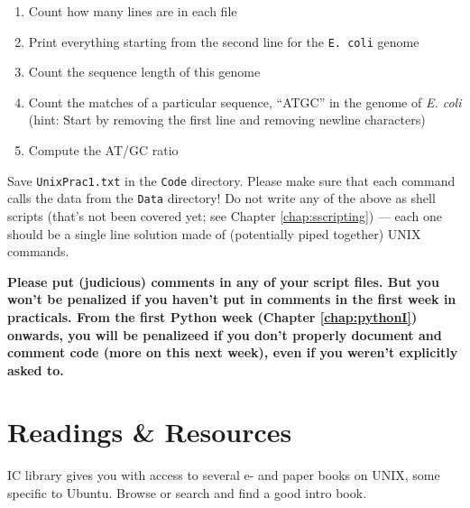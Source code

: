 \begin{enumerate}
    \begin{enumerate}
    
     \item Count how many lines are in each file

     \item Print everything starting from the second line for the {\tt E. 
coli} genome

    \item Count the sequence length of this genome

     \item Count the matches of a particular sequence, ``ATGC'' in
the genome of \textit{E. coli} (hint: Start by removing the first line 
and removing newline characters)
     


    \item Compute the AT/GC ratio
    
   
    \end{enumerate}
    
Save {\tt UnixPrac1.txt} in the {\tt Code} directory. Please make sure 
that each command calls the data from the {\tt Data} directory! Do not 
write any of the above as shell scripts (that's not been covered yet; 
see Chapter \ref{chap:sscripting})  --- each one should be a single 
line solution made of (potentially piped together) UNIX commands.

{\bf Please put (judicious) comments in any of your script files. But 
you won't be penalized if you haven't put in comments in the first week 
in practicals. From the first Python week (Chapter \ref{chap:pythonI}) 
onwards, you will be penalizeed if you don't properly document and 
comment code (more on this next week), even if you weren't explicitly 
asked to.}

\end{enumerate}

\section{Readings \& Resources}
IC library gives you with access to several e- and paper books on UNIX, some 
specific to Ubuntu. Browse or search and find a good intro book.

